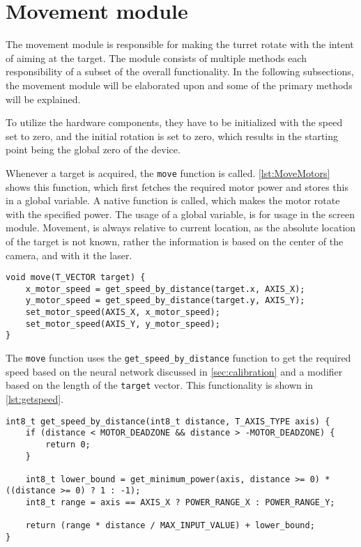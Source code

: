 \section{Movement module}
\label{sec:movement}
The movement module is responsible for making the turret rotate with the intent of aiming at the target.
The module consists of multiple methods each responsibility of a subset of the overall functionality.
In the following subsections, the movement module will be elaborated upon and some of the primary methods will be explained.

To utilize the hardware components, they have to be initialized with the speed set to zero, and the initial rotation is set to zero, which results in the starting point being the global zero of the device.

Whenever a target is acquired, the \texttt{move} function is called.
\autoref{lst:MoveMotors} shows this function, which first fetches the required motor power and stores this in a global variable.
A native function is called, which makes the motor rotate with the specified power.
The usage of a global variable, is for usage in the screen module.
Movement, is always relative to current location, as the absolute location of the target is not known, rather the information is based on the center of the camera, and with it the laser.

\begin{lstlisting}[language=CSharp,caption={move method from movement.c},label={lst:MoveMotors}]
void move(T_VECTOR target) {
    x_motor_speed = get_speed_by_distance(target.x, AXIS_X);
    y_motor_speed = get_speed_by_distance(target.y, AXIS_Y);
    set_motor_speed(AXIS_X, x_motor_speed);
    set_motor_speed(AXIS_Y, y_motor_speed);
}
\end{lstlisting}


The \texttt{move} function uses the \texttt{get\_speed\_by\_distance} function to get the required speed based on the neural network discussed in \autoref{sec:calibration} and a modifier based on the length of the \texttt{target} vector.
This functionality is shown in \autoref{lst:getspeed}.

\begin{lstlisting}[language=CSharp,caption={get\_speed\_by\_distance method from movement.c},label={lst:getspeed},firstnumber={109}]
int8_t get_speed_by_distance(int8_t distance, T_AXIS_TYPE axis) {
    if (distance < MOTOR_DEADZONE && distance > -MOTOR_DEADZONE) {
        return 0;
    }

    int8_t lower_bound = get_minimum_power(axis, distance >= 0) * ((distance >= 0) ? 1 : -1);
    int8_t range = axis == AXIS_X ? POWER_RANGE_X : POWER_RANGE_Y;

    return (range * distance / MAX_INPUT_VALUE) + lower_bound;
}
\end{lstlisting}

